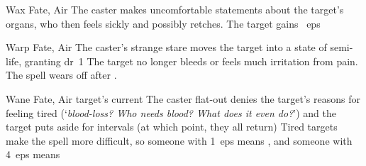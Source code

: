 \ifodd\value{diceNo}
  {}%
  {Wax}%
  {Fate, Air}%
  {}%
  {The caster makes uncomfortable statements about the target's organs, who then feels sickly and possibly retches.
  The target gains ~\glspl{ep}}%
  {}

\else

  {}%
  {Warp}%
  {Fate, Air}%
  {}%
  {The caster's strange stare moves the target into a state of semi-life, granting \gls{dr}~1}%
  {
    The target no longer bleeds or feels much irritation from pain.
    The spell wears off after .}

  {}%
  {Wane}%
  {Fate, Air}%
  {target's current }%
  {The caster flat-out denies the target's reasons for feeling tired (`\textit{blood-loss? Who needs blood?  What does it even do?}') and the target puts aside   for  \glspl{interval} (at which point, they all return)}%
  {
  Tired targets make the \gls{spell} more difficult, so someone with 1~\glspl{ep} means \tn[8], and someone with 4~\glspl{ep} means \tn[11]}

\fi
{}
